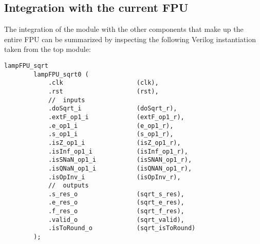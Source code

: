 \documentclass[paper=letter, fontsize=12pt]{article}
\begin{document}
\subsection{Integration with the current FPU}
The integration of the module with the other components that make up the entire FPU can be summarized by inspecting the following Verilog instantiation taken from the top module:
\begin{lstlisting}
lampFPU_sqrt
        lampFPU_sqrt0 (
            .clk                    (clk),
            .rst                    (rst),
            //  inputs
            .doSqrt_i               (doSqrt_r),
            .extF_op1_i             (extF_op1_r),
            .e_op1_i                (e_op1_r),
            .s_op1_i                (s_op1_r),
            .isZ_op1_i				(isZ_op1_r),
            .isInf_op1_i            (isInf_op1_r),
            .isSNaN_op1_i           (isSNAN_op1_r),
            .isQNaN_op1_i           (isQNAN_op1_r),
            .isOpInv_i              (isOpInv_r),
            //  outputs
            .s_res_o                (sqrt_s_res),
            .e_res_o                (sqrt_e_res),
            .f_res_o                (sqrt_f_res),
            .valid_o                (sqrt_valid),
            .isToRound_o            (sqrt_isToRound)
        );
\end{lstlisting}
\end{document}
